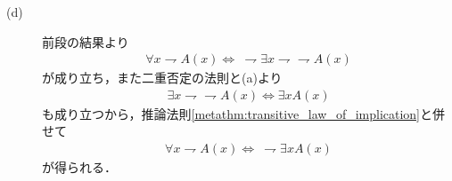 \begin{prf}
\begin{description}
			\item[(d)]
				前段の結果より
				\begin{align}
					\forall x \rightharpoondown A(x) \Longleftrightarrow\ 
					\rightharpoondown \exists x \rightharpoondown \rightharpoondown A(x)
				\end{align}
				が成り立ち，また二重否定の法則と(a)より
				\begin{align}
					\exists x \rightharpoondown \rightharpoondown A(x)
					\Longleftrightarrow \exists x A(x)
				\end{align}
				も成り立つから，推論法則\ref{metathm:transitive_law_of_implication}と併せて
				\begin{align}
					\forall x \rightharpoondown A(x) \Longleftrightarrow\ 
					\rightharpoondown \exists x A(x)
				\end{align}
				が得られる．
			

\end{description}
\end{prf}
